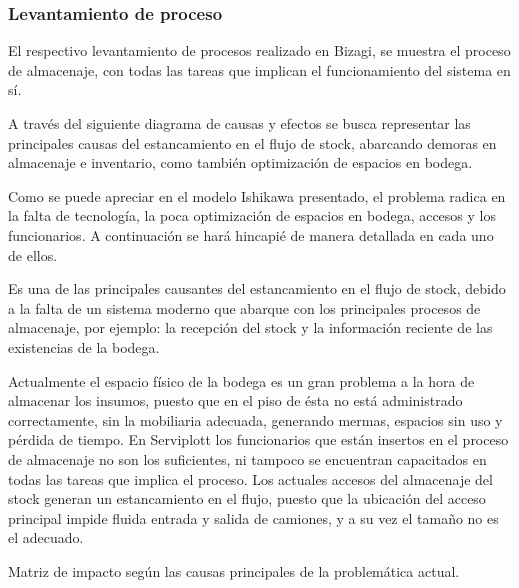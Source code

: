     \subsubsection{Levantamiento de proceso}
    El respectivo levantamiento de procesos realizado en Bizagi, se muestra el proceso de almacenaje, con todas las tareas que implican el funcionamiento del sistema en sí.

	A través del siguiente diagrama de causas y efectos se busca representar las
principales causas del estancamiento en el flujo de stock, abarcando demoras en
almacenaje e inventario, como también optimización de espacios en bodega.	


Como se puede apreciar en el modelo Ishikawa presentado, el problema radica en la
falta de tecnología, la poca optimización de espacios en bodega, accesos y los
funcionarios. A continuación se hará hincapié de manera detallada en cada uno de
ellos.

 Es una de las principales causantes del estancamiento en el flujo de stock, debido a la falta de un sistema moderno que abarque con los principales procesos de almacenaje, por ejemplo: la recepción del stock y la información reciente de las existencias de la bodega.

 Actualmente el espacio físico de la bodega es un gran problema a la hora de almacenar los insumos, puesto que en el piso de ésta no está administrado correctamente, sin la mobiliaria adecuada,
generando mermas, espacios sin uso y pérdida de tiempo.
 En Serviplott los funcionarios que están insertos en el proceso de almacenaje no son los suficientes, ni tampoco se encuentran capacitados en todas las tareas que implica el proceso.
 Los actuales accesos del almacenaje del stock generan un estancamiento en el flujo, puesto que la ubicación del acceso principal impide fluida entrada y salida de camiones, y a su vez el tamaño no es el adecuado.

	
	Matriz de impacto según las causas principales de la problemática actual.
	
